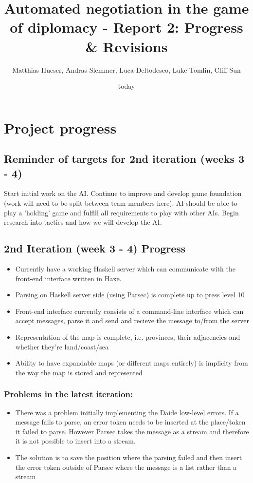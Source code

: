 \documentclass[12pt]{article}
\title{Automated negotiation in the game of diplomacy - Report 2: Progress & Revisions}
\author{Matthias Hueser, Andras Slemmer, Luca Deltodesco, Luke Tomlin, Cliff Sun}
\date{today}
\begin{document}
\maketitle

\section{Project progress}

\subsection{Reminder of targets for 2nd iteration (weeks 3 - 4)}



Start initial work on the AI. Continue to improve and develop game
foundation (work will need to be split between team members here).
AI should be able to play a 'holding' game and fulfill all requirements
to play with other AIs. Begin research into tactics and how we will
develop the AI.

\subsection{2nd Iteration (week 3 - 4) Progress}

\begin{itemize}
\item Currently have a working Haskell server which can communicate with
the front-end interface written in Haxe. 
\item Parsing on Haskell server side (using Parsec) is complete up to press
level 10 
\item Front-end interface currently consists of a command-line interface
which can accept messages, parse it and send and recieve the message
to/from the server
\item Representation of the map is complete, i.e. provinces, their adjacencies
and whether they're land/coast/sea
\item Ability to have expandable maps (or different maps entirely) is implicity
from the way the map is stored and represented
\end{itemize}

\subsubsection{Problems in the latest iteration:}

\begin{itemize}
\item There was a problem initially implementing the Daide low-level errors.
If a message fails to parse, an error token needs to be inserted at
the place/token it failed to parse. However Parsec takes the message
as a stream and therefore it is not possible to insert into a stream. 
\item The solution is to save the position where the parsing failed and
then insert the error token outside of Parsec where the message is
a list rather than a stream
\end{itemize}
\end{document}

